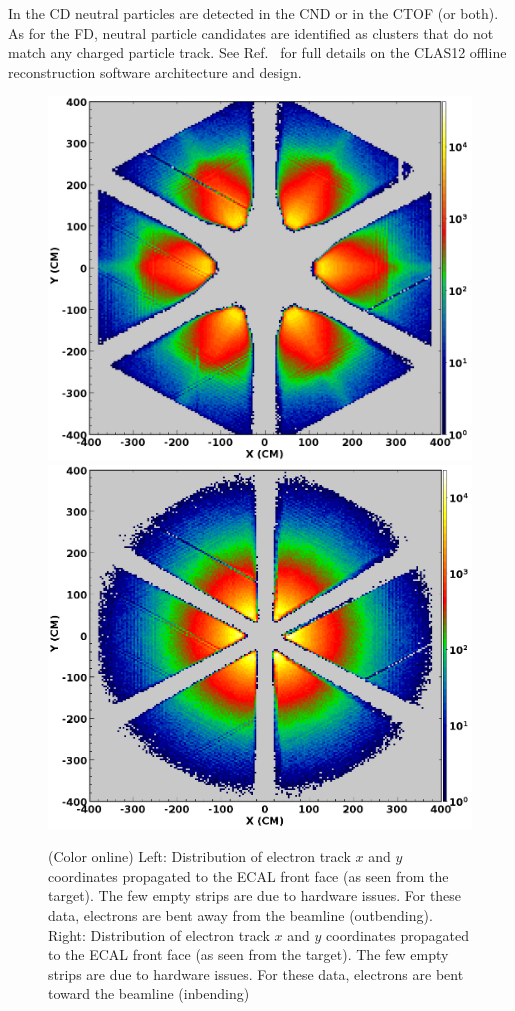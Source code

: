 \documentclass[final,3p,twocolumn]{elsarticle}
\begin{document}
In the CD neutral particles are detected in the CND or in the CTOF (or both). As for the FD, neutral particle
candidates are identified as clusters that do not match any charged particle track. See Ref.~\cite{Software} for
full details on the CLAS12 offline reconstruction software architecture and design.



\begin{figure}[t!]
\centerline{\includegraphics[width=1.0\columnwidth]{e-outbending.png}
\hspace{0.5cm}\includegraphics[width=1.0\columnwidth]{e-inbending.png}}
\caption{(Color online) Left: Distribution of electron track $x$ and $y$ coordinates propagated to the ECAL front face (as seen from
  the target). The few empty strips are due to hardware issues. For these data, electrons are bent away from the
  beamline (outbending). Right: Distribution of electron track $x$ and $y$ coordinates propagated to the ECAL front face 
  (as seen from the target). The few empty strips are due to hardware issues. For these data, electrons are bent toward the
  beamline (inbending)} 
\label{electrons-xy}
\end{figure}
\end{document}
